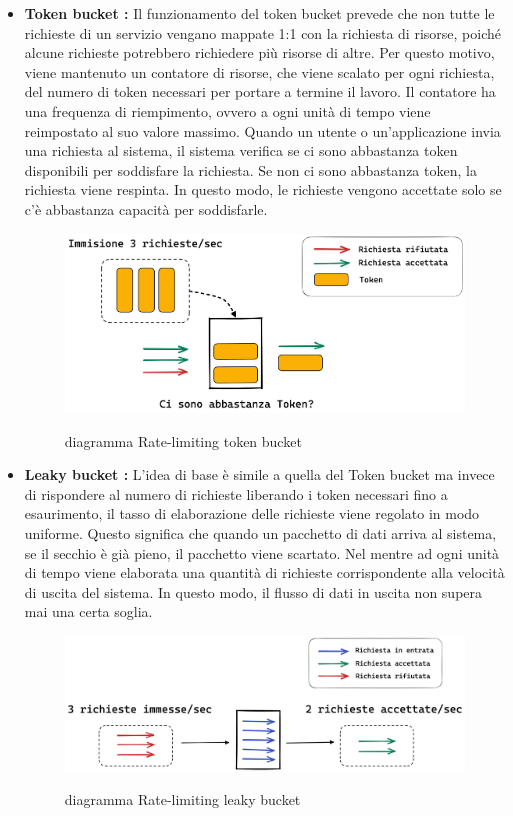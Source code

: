 \begin{itemize}
    \item \textbf{Token bucket :} Il funzionamento del token bucket prevede che non tutte le richieste di un servizio
    vengano mappate 1:1 con la richiesta di risorse, poiché alcune richieste potrebbero richiedere più risorse di altre.
    Per questo motivo, viene mantenuto un contatore di risorse, che viene scalato per ogni richiesta, del numero di
    token necessari per portare a termine il lavoro. Il contatore ha una frequenza di riempimento, ovvero a ogni unità
    di tempo viene reimpostato al suo valore massimo. Quando un utente o un'applicazione invia una richiesta al sistema,
    il sistema verifica se ci sono abbastanza token disponibili per soddisfare la richiesta. Se non ci sono abbastanza
    token, la richiesta viene respinta. In questo modo, le richieste vengono accettate solo se c'è abbastanza capacità
    per soddisfarle.
        \begin{figure}[H]
        \centering
        \includegraphics[width=12cm]{./immagini/mieimmagini/token_bucket.png}
        \label{token bucket diagram}
        \caption{diagramma Rate-limiting token bucket }
        \end{figure}
    
    \item \textbf{Leaky bucket :} L'idea di base è simile a quella del Token bucket ma invece di rispondere al numero di
    richieste liberando i token necessari fino a esaurimento, il tasso di elaborazione delle richieste viene regolato in
    modo uniforme. Questo significa che quando un pacchetto di dati arriva al sistema, se il secchio è già pieno, il
    pacchetto viene scartato. Nel mentre ad ogni unità di tempo viene elaborata una quantità di richieste corrispondente
    alla velocità di uscita del sistema. In questo modo, il flusso di dati in uscita non supera mai una certa soglia.
        \begin{figure}[H]
        \centering
        \includegraphics[width=12cm]{./immagini/mieimmagini/leaky_bucket.png}
        \label{leaky bucket diagram}
        \caption{diagramma Rate-limiting leaky bucket }
        \end{figure}
    

\end{itemize}
